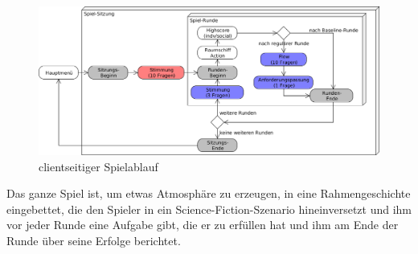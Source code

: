 \documentclass[a4paper,12pt]{scrartcl}
\begin{document}
\begin{figure}[htp]
\begin{center}
  \includegraphics[width=\textwidth]{SpielablaufClient.png}
  \caption{clientseitiger Spielablauf}
  \label{fig:ClientSpielablauf}
\end{center}
\end{figure} 

Das ganze Spiel ist, um etwas Atmosphäre zu erzeugen, in eine Rahmengeschichte
eingebettet, die den Spieler in ein Science-Fiction-Szenario hineinversetzt und ihm vor jeder
Runde eine Aufgabe gibt, die er zu erfüllen hat und ihm am Ende der Runde über seine
Erfolge berichtet.
\end{document}
